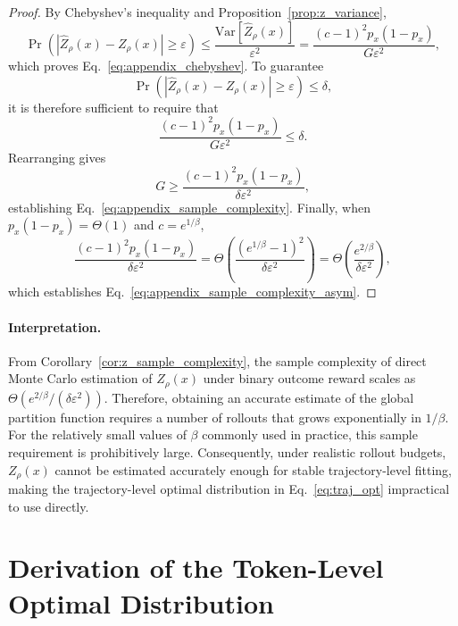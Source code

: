 \documentclass{article}
\begin{document}
\begin{proof}
By Chebyshev's inequality and Proposition~\ref{prop:z_variance},
\begin{equation}
\Pr\!\left(
\left|\widehat{Z}_\rho(x)-Z_\rho(x)\right| \ge \varepsilon
\right)
\le
\frac{\mathrm{Var}[\widehat{Z}_\rho(x)]}{\varepsilon^2}
=
\frac{(c-1)^2 p_x(1-p_x)}{G \varepsilon^2},
\end{equation}
which proves Eq.~\eqref{eq:appendix_chebyshev}. To guarantee
\begin{equation}
\Pr\!\left(
\left|\widehat{Z}_\rho(x)-Z_\rho(x)\right| \ge \varepsilon
\right)
\le \delta,
\end{equation}
it is therefore sufficient to require that
\begin{equation}
\frac{(c-1)^2 p_x(1-p_x)}{G \varepsilon^2} \le \delta.
\end{equation}
Rearranging gives
\begin{equation}
G \ge \frac{(c-1)^2 p_x(1-p_x)}{\delta \varepsilon^2},
\end{equation}
establishing Eq.~\eqref{eq:appendix_sample_complexity}. Finally, when $p_x(1-p_x)=\Theta(1)$ and $c=e^{1/\beta}$,
\begin{equation}
\frac{(c-1)^2 p_x(1-p_x)}{\delta \varepsilon^2}
=
\Theta\!\left(\frac{(e^{1/\beta}-1)^2}{\delta \varepsilon^2}\right)
=
\Theta\!\left(\frac{e^{2/\beta}}{\delta \varepsilon^2}\right),
\end{equation}
which establishes Eq.~\eqref{eq:appendix_sample_complexity_asym}.
\end{proof}

\paragraph{Interpretation.}
From Corollary~\ref{cor:z_sample_complexity}, the sample complexity of direct Monte Carlo estimation of $Z_\rho(x)$ under binary outcome reward scales as $\Theta\!\left(e^{2/\beta}/(\delta \varepsilon^2)\right)$. Therefore, obtaining an accurate estimate of the global partition function requires a number of rollouts that grows exponentially in $1/\beta$. For the relatively small values of $\beta$ commonly used in practice, this sample requirement is prohibitively large. Consequently, under realistic rollout budgets, $Z_\rho(x)$ cannot be estimated accurately enough for stable trajectory-level fitting, making the trajectory-level optimal distribution in Eq.~\eqref{eq:traj_opt} impractical to use directly.


\section{Derivation of the Token-Level Optimal Distribution}
\label{app:token_opt_derivation}
\end{document}
